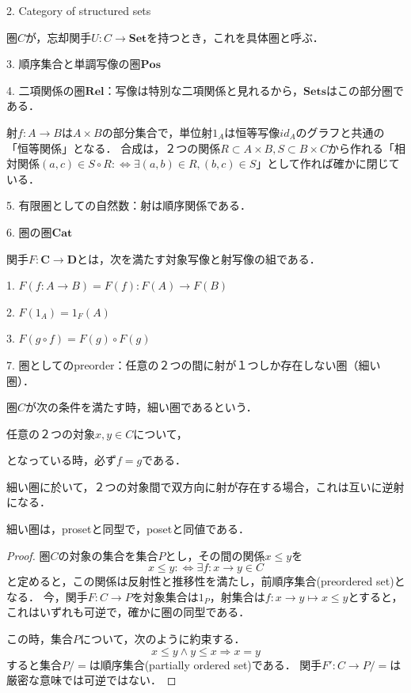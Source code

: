 \documentclass[uplatex, 12pt, dvipdfmx]{jsarticle}
\begin{document}
2. Category of structured sets
\begin{definition*}[具体圏]
    圏$C$が，忘却関手$U:C\to\mathbf{Set}$を持つとき，これを具体圏と呼ぶ．
\end{definition*}

3. 順序集合と単調写像の圏$\mathbf{Pos}$

4. 二項関係の圏$\mathbf{Rel}$：写像は特別な二項関係と見れるから，$\mathbf{Sets}$はこの部分圏である．

射$f:A\to B$は$A\times B$の部分集合で，単位射$1_A$は恒等写像$id_A$のグラフと共通の「恒等関係」となる．
合成は，２つの関係$R\subset A\times B, S\subset B\times C$から作れる「相対関係$(a,c)\in S\circ R:\Leftrightarrow \exists (a,b)\in R, (b,c)\in S$」として作れば確かに閉じている．

5. 有限圏としての自然数：射は順序関係である．

6. 圏の圏$\mathbf{Cat}$
\begin{definition}[Functor]
    関手$F:\mathbf{C}\to\mathbf{D}$とは，次を満たす対象写像と射写像の組である．

    1. $F(f:A\to B)=F(f):F(A)\to F(B)$

    2. $F(1_A)=1_F(A)$

    3. $F(g\circ f)=F(g)\circ F(g)$
\end{definition}

7. 圏としてのpreorder：任意の２つの間に射が１つしか存在しない圏（細い圏）．

\begin{definition*}
    圏$C$が次の条件を満たす時，細い圏であるという．
    
    任意の２つの対象$x,y\in C$について，
    \begin{center}\end{center}
    となっている時，必ず$f=g$である．
\end{definition*}
\begin{remark*}
    細い圏に於いて，２つの対象間で双方向に射が存在する場合，これは互いに逆射になる．
\end{remark*}
\begin{proposition*}
    細い圏は，prosetと同型で，posetと同値である．
\end{proposition*}
\begin{proof}
    圏$C$の対象の集合を集合$P$とし，その間の関係$x\le y$を
    \[ x\le y:\Leftrightarrow \exists f:x\to y\in C \]
    と定めると，この関係は反射性と推移性を満たし，前順序集合(preordered set)となる．
    今，関手$F:C\to P$を対象集合は$1_P$，射集合は$f:x\to y\mapsto x\le y$とすると，これはいずれも可逆で，確かに圏の同型である．

    この時，集合$P$について，次のように約束する．
    \[ x\le y\land y\le x\Rightarrow x=y \]
    すると集合$P/=$は順序集合(partially ordered set)である．
    関手$F':C\to P/=$は厳密な意味では可逆ではない．
\end{proof}
\end{document}
